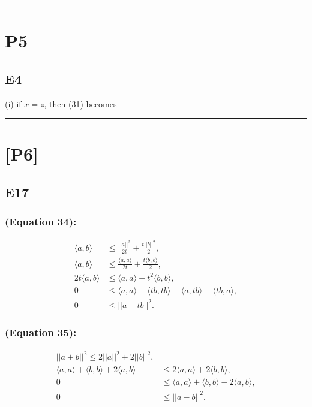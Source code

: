 \documentclass[12pt]{article}
\begin{document}
\hrule
\vspace{0.1cm}
\section*{P5}
\subsection*{E4}
(i) if $x = z$, then (31) becomes

\vspace{0.1cm}

\hrule
\vspace{0.1cm}
\section*{[P6]}
\subsection*{E17}
\subsubsection*{(Equation 34):}
\begin{equation}
    \begin{split}
        \langle a, b \rangle &\leq \frac{||a||^2}{2t} + \frac{t||b||^2}{2}, \\
        \langle a, b \rangle &\leq \frac{\langle a, a \rangle}{2t} + \frac{t \langle b, b \rangle}{2}, \\
        2t \langle a, b \rangle &\leq \langle a, a \rangle + t^2 \langle b, b \rangle, \\
        0 &\leq \langle a, a \rangle + \langle tb, tb \rangle - \langle a, tb \rangle - \langle tb, a \rangle, \\
        0 &\leq ||a - tb||^2. 
    \end{split}
\end{equation}
\subsubsection*{(Equation 35):}
\begin{equation}
    \begin{split}
        ||a+b||^2 \leq 2||a||^2 + 2||b||^2, \\
        \langle a, a\rangle + \langle b, b\rangle + 2 \langle a, b\rangle & \leq 2\langle a, a\rangle + 2\langle b, b\rangle, \\
        0 &\leq \langle a, a\rangle + \langle b, b\rangle -  2 \langle a, b\rangle, \\
        0 &\leq ||a-b||^2.
    \end{split}    
\end{equation}
\end{document}
